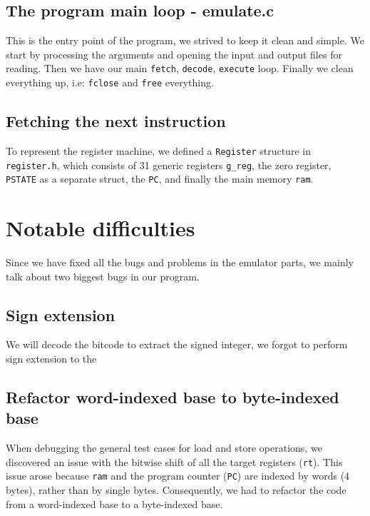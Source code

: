 \documentclass[11pt]{article}
\begin{document}
\subsection{The program main loop - emulate.c}
This is the entry point of the program, we strived to keep it clean and simple. 
We start by processing the arguments and opening the input and output files for
reading. Then we have our main \texttt{fetch}, \texttt{decode}, 
\texttt{execute} loop. Finally we clean everything up, i.e: \texttt{fclose} and
\texttt{free} everything.

\subsection{Fetching the next instruction}

To represent the register machine, we defined a \texttt{Register} structure in
\texttt{register.h}, which consists of 31 generic registers \texttt{g\_reg},
the zero register, \texttt{PSTATE} as a separate struct, the \texttt{PC}, and
finally the main memory \texttt{ram}.

\section{Notable difficulties}
Since we have fixed all the bugs and problems in the emulator parts, we mainly
talk about two biggest bugs in our program. 

\subsection{Sign extension}
We will decode the bitcode to extract the signed integer, we forgot to perform 
sign extension to the 

\subsection{Refactor word-indexed base to byte-indexed base}
When debugging the general test cases for load and store operations, 
we discovered an issue with the bitwise shift of all the target registers (\texttt{rt}). 
This issue arose because \texttt{ram} and the program counter (\texttt{PC}) are indexed by words (4 bytes), 
rather than by single bytes. 
Consequently, we had to refactor the code from a word-indexed base to a byte-indexed base.
\end{document}
